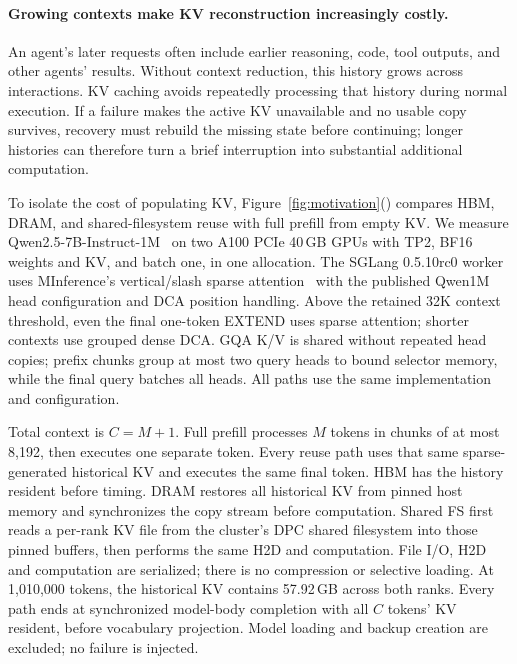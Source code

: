 \paragraph{Growing contexts make KV reconstruction increasingly costly.}
\label{sec:motivation-long-context}
An agent's later requests often include earlier reasoning, code, tool
outputs, and other agents' results. Without context reduction, this history
grows across interactions. KV caching avoids repeatedly processing that
history during normal execution. If a failure makes the active KV
unavailable and no usable copy survives, recovery must rebuild the missing
state before continuing; longer histories can therefore turn a brief
interruption into substantial additional computation.

To isolate the cost of populating KV,
Figure~\ref{fig:motivation}() compares
HBM, DRAM, and shared-filesystem reuse with full prefill from empty KV.
We measure Qwen2.5-7B-Instruct-1M~\cite{qwen2025qwen25oneM} on two A100
PCIe 40\,GB GPUs with TP2, BF16 weights and KV, and batch one, in one
allocation. The SGLang 0.5.10rc0 worker uses MInference's vertical/slash
sparse attention~\cite{jiang2024minference} with the published Qwen1M
head configuration and DCA position handling. Above the retained 32K
context threshold, even the final one-token EXTEND uses sparse attention;
shorter contexts use grouped dense DCA. GQA K/V is shared without repeated
head copies; prefix chunks group at most two query heads to bound selector
memory, while the final query batches all heads. All paths use the same
implementation and configuration.

Total context is $C=M+1$. Full prefill processes $M$ tokens in chunks of
at most 8,192, then executes one separate token. Every reuse path uses
that same sparse-generated historical KV and executes the same final
token. HBM has the history resident before timing. DRAM restores all
historical KV from pinned host memory and synchronizes the copy stream
before computation. Shared FS first reads a per-rank KV file from the
cluster's DPC shared filesystem into those pinned buffers, then performs
the same H2D and computation. File I/O, H2D and computation are serialized;
there is no compression or selective loading. At 1,010,000 tokens,
the historical KV contains 57.92\,GB across both ranks.
Every path ends at synchronized model-body completion with all $C$
tokens' KV resident, before vocabulary projection. Model loading and
backup creation are excluded; no failure is injected.

